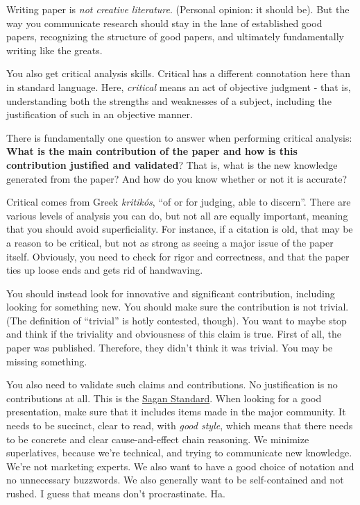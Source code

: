 \documentclass[10pt, oneside]{article}
\begin{document}
Writing paper is \textit{not creative literature}. (Personal opinion: it should be). But the way you communicate research should stay in the lane of established good papers, recognizing the structure of good papers, and ultimately fundamentally writing like the greats. 

You also get critical analysis skills. Critical has a different connotation here than in standard language. Here, \textit{critical} means an act of objective judgment - that is, understanding both the strengths and weaknesses of a subject, including the justification of such in an objective manner.

There is fundamentally one question to answer when performing critical analysis:
\textbf{What is the main contribution of the paper and how is this contribution justified and validated}? That is, what is the new knowledge generated from the paper? And how do you know whether or not it is accurate?

Critical comes from Greek \textit{kritikós}, ``of or for judging, able to discern''. There are various levels of analysis you can do, but not all are equally important, meaning that you should avoid superficiality. For instance, if a citation is old, that may be a reason to be critical, but not as strong as seeing a major issue of the paper itself. 
Obviously, you need to check for rigor and correctness, and that the paper ties up loose ends and gets rid of handwaving. 

You should instead look for innovative and significant contribution, including looking for something new. You should make sure the contribution is not trivial. (The definition of ``trivial'' is hotly contested, though). 
You want to maybe stop and think if the triviality and obviousness of this claim is true. First of all, the paper was published. Therefore, they didn't think it was trivial. You may be missing something. 

You also need to validate such claims and contributions. No justification is no contributions at all. This is the \href{https://en.wikipedia.org/wiki/Extraordinary_claims_require_extraordinary_evidence}{Sagan Standard}. 
When looking for a good presentation, make sure that it includes items made in the major community. It needs to be succinct, clear to read, with \textit{good style}, which means that there needs to be concrete and clear cause-and-effect chain reasoning. We minimize superlatives, because we're technical, and trying to communicate new knowledge. We're not marketing experts. We also want to have a good choice of notation and no unnecessary buzzwords. We also generally want to be self-contained and not rushed. I guess that means don't procrastinate. Ha. 
\end{document}
